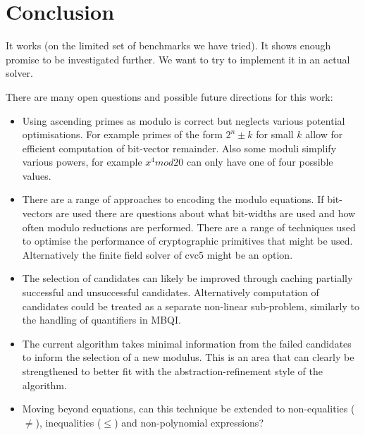 \section{Conclusion}
\label{section:conclusion}

%
It works (on the limited set of benchmarks we have tried).
%
It shows enough promise to be investigated further.
We want to try to implement it in an actual solver.


There are many open questions and possible future directions for this work:

\begin{itemize}
\item{Using ascending primes as modulo is correct but neglects various
  potential optimisations.  For example primes of the form $2^n \pm k$
  for small $k$ allow for efficient computation of bit-vector
  remainder.  Also some moduli simplify various powers, for example
  $x^4 mod 20$ can only have one of four possible values.}

\item{There are a range of approaches to encoding the modulo
  equations.
  If bit-vectors are used there are questions about what
  bit-widths are used and how often modulo reductions are performed.
  There are a range of techniques used to optimise the performance of
  cryptographic primitives that might be used.
  Alternatively the finite field solver of cvc5 might be an option.}
  
\item{The selection of candidates can likely be improved through
  caching partially successful and unsuccessful candidates.
  Alternatively computation of candidates could be treated as a
  separate non-linear sub-problem, similarly to the handling of
  quantifiers in MBQI.}

\item{The current algorithm takes minimal information from the failed
  candidates to inform the selection of a new modulus.  This is an
  area that can clearly be strengthened to better fit with the
  abstraction-refinement style of the algorithm.}

\item{Moving beyond equations, can this technique be extended to
  non-equalities ($\not=$), inequalities ($\leq$) and non-polynomial
  expressions?}
\end{itemize}
